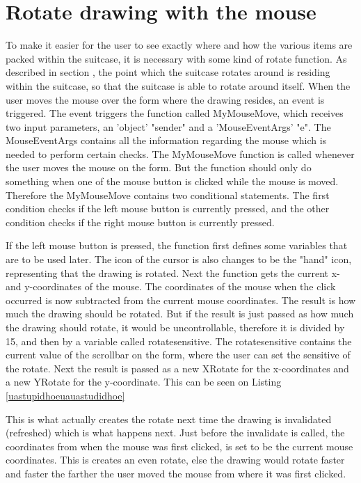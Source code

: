 \section{Rotate drawing with the mouse}

To make it easier for the user to see exactly where and how the various items are packed within the suitcase, it is necessary with some kind of rotate function. As described in section , the point which the suitcase rotates around is residing within the suitcase, so that the suitcase is able to rotate around itself. When the user moves the mouse over the form where the drawing resides, an event is triggered. The event triggers the function called MyMouseMove, which receives two input parameters, an 'object' "sender" and a 'MouseEventArgs' "e". The MouseEventArgs contains all the information regarding the mouse which is needed to perform certain checks. The MyMouseMove function is called whenever the user moves the mouse on the form. But the function should only do something when one of the mouse button is clicked while the mouse is moved. Therefore the MyMouseMove contains two conditional statements. The first condition checks if the left mouse button is currently pressed, and the other condition checks if the right mouse button is currently pressed.

If the left mouse button is pressed, the function first defines some variables that are to be used later. The icon of the cursor is also changes to be the "hand" icon, representing that the drawing is rotated. Next the function gets the current x- and y-coordinates of the mouse. The coordinates of the mouse when the click occurred is now subtracted from the current mouse coordinates. The result is how much the drawing should be rotated. But if the result is just passed as how much the drawing should rotate, it would be uncontrollable, therefore it is divided by 15, and then by a variable called rotatesensitive. The rotatesensitive contains the current value of the scrollbar on the form, where the user can set the sensitive of the rotate. Next the result is passed as a new XRotate for the x-coordinates and a new YRotate for the y-coordinate. This can be seen on Listing \ref{uastupidhoeuauastudidhoe}


 This is what actually creates the rotate  next time the drawing is invalidated (refreshed) which is what happens next. Just before the invalidate is called, the coordinates from when the mouse was first clicked, is set to be the current mouse coordinates. This is creates an even rotate, else the drawing would rotate faster and faster the farther the user moved the mouse from where it was first clicked. 